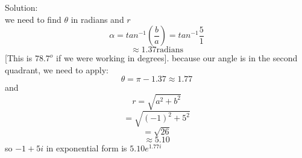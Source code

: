 \documentclass[a4paper, 12pt]{report}
\begin{document}
{Solution:\\
we need to find $\theta$ in radians and $r$
\begin{equation*}
\alpha = tan^{-1}(\frac{b}{a}) = tan^{-1}\frac{5}{1}
\end{equation*}
\begin{equation*}
\approx 1. 37 \text{radians}
\end{equation*}
[This is $78.7^o$ if we were working in degrees].
because our angle is in the second quadrant, we need to apply:
\begin{equation*}
\theta = \pi - 1.37 \approx 1.77
\end{equation*}
and
\begin{equation*}
r = \sqrt{a^2 + b^2}
\end{equation*}
\begin{equation*}
 = \sqrt{(-1)^2 + 5^2}
\end{equation*}
\begin{equation*}
 = \sqrt{26}
\end{equation*}
\begin{equation*}
\approx 5.10
\end{equation*}
so $-1 + 5i$ in exponential form is $5.10e^{1.77i}$
}
\end{document}
